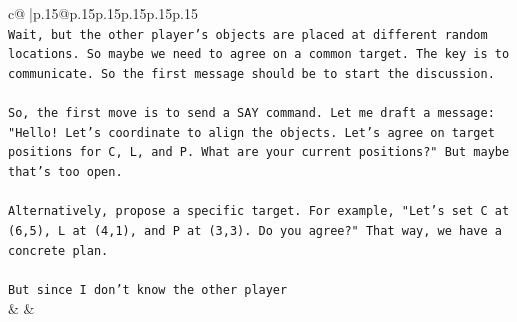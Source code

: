 \documentclass{article}
\begin{document}
{\begin{supertabular}{c@{$\;$}|p{.15\linewidth}@{}p{.15\linewidth}p{.15\linewidth}p{.15\linewidth}p{.15\linewidth}p{.15\linewidth}}
{{{\\ 
\texttt{Wait, but the other player's objects are placed at different random locations. So maybe we need to agree on a common target. The key is to communicate. So the first message should be to start the discussion. } \\
\\ 
\texttt{So, the first move is to send a SAY command. Let me draft a message: "Hello! Let's coordinate to align the objects. Let's agree on target positions for C, L, and P. What are your current positions?" But maybe that's too open. } \\
\\ 
\texttt{Alternatively, propose a specific target. For example, "Let's set C at (6,5), L at (4,1), and P at (3,3). Do you agree?" That way, we have a concrete plan. } \\
\\ 
\texttt{But since I don't know the other player} \\
            }
        }
    }
    & & \\ \\


\end{supertabular}}
\end{document}
